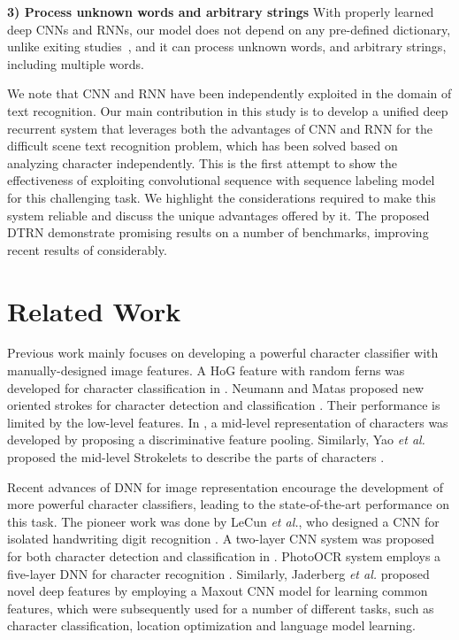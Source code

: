 \documentclass[letterpaper]{article}
\begin{document}
\noindent\textbf{3) Process unknown words and arbitrary strings}
With properly learned deep CNNs and RNNs, our model does not depend on any pre-defined dictionary, unlike exiting studies~\cite{Jaderberg2015b,Jaderberg2014,Wang2012}, and  it can process unknown words, and arbitrary strings, including multiple words.


We note that CNN and RNN have been independently exploited in the domain of text recognition. Our main contribution in this study is to develop a unified deep recurrent system that leverages both the advantages of CNN and RNN for the difficult scene text recognition problem, which has been solved based on analyzing character independently. This is the first attempt to show the effectiveness of exploiting convolutional sequence with sequence labeling model for this challenging task. We highlight the considerations required to make this system reliable and discuss the unique advantages offered by it.
The proposed DTRN demonstrate promising results on a number of benchmarks, improving recent results of \cite{Jaderberg2014,Almazan2014} considerably.


\section{Related Work}
Previous work mainly focuses on developing a powerful character classifier with manually-designed image features.
A HoG feature with random ferns was developed for character classification in \cite{Wang2011}. Neumann and Matas proposed new oriented strokes for character detection and classification \cite{Neumann2013}.
Their performance is limited by the low-level features. In \cite{Lee2014}, a mid-level representation of characters was developed by proposing a discriminative feature pooling. Similarly, Yao \emph{et al.} proposed the mid-level Strokelets to describe the parts of characters \cite{Yao2014}.


Recent advances of DNN for image representation encourage the development of more powerful character classifiers, leading to the state-of-the-art performance on this task. The pioneer work was done by LeCun \emph{et al.}, who designed a CNN for isolated handwriting digit recognition \cite{LeCun1998}. A two-layer CNN system was proposed for both character detection and classification in \cite{Wang2012}. PhotoOCR system employs a five-layer DNN for character recognition \cite{Bissacco2013}. Similarly, Jaderberg \emph{et al.} \cite{Jaderberg2014} proposed novel deep features by employing a Maxout CNN model for learning common features, which were subsequently used for a number of different tasks, such as character classification, location optimization and language model learning.
\end{document}
